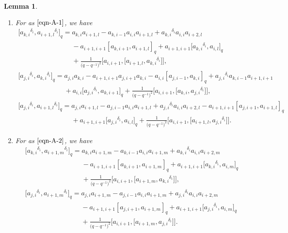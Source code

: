 \documentclass[10pt,a4paper]{amsart}
\numberwithin{equation}{section}
\def\lr#1{\left[#1\right]}
\def\d{\delta}
\def\A{\mathscr{A}}
\newtheorem{Lemma}[Theorem]{Lemma}
\begin{document}
\begin{Lemma}
\begin{enumerate}
\begin{gather}
\end{gather}
\item[$(2)$] For \smash{$\A_{j,k,i+1}^{k-1,i,l}$} as $\eqref{eqn-A-1}$, we have
\begin{gather}
\bigl[{a_{k,i}}^{\d_i},{a_{i+1,l}}^{\d_i}\bigr]_q
=a_{k,i}a_{i+1,l}-a_{k,i-1}a_{i,i}a_{i+1,l} +{a_{k,i}}^{\d_i}a_{i,i}a_{i+2,l}\nonumber \\
\phantom{\bigl[{a_{k,i}}^{\d_i},{a_{i+1,l}}^{\d_i}\bigr]_q
=}{}-a_{i+1,i+1}\lr{a_{k,i+1},a_{i+1,l}}_q
+a_{i+1,i+1}\bigl[{a_{k,i}}^{\d_i},a_{i,l}\bigr]_q\nonumber \\
\phantom{\bigl[{a_{k,i}}^{\d_i},{a_{i+1,l}}^{\d_i}\bigr]_q
=}{} +\frac{1}{\bigl(q-q^{-1}\bigr)^2}\bigl[a_{i,i+1},\bigl[a_{i+1,l},{a_{k,i}}^{\d_i}\bigr]\bigr], \label{ri-1} \\
\bigl[{a_{j,i}}^{\d_i},{a_{k,i}}^{\d_i}\bigr]_q=a_{j,i}a_{k,i} -a_{i+1,i+1}a_{j,i+1}a_{k,i}-a_{i,i}\lr{a_{j,i-1},a_{k,i}}_q +{a_{j,i}}^{\d_i}a_{k,i-1}a_{i+1,i+1}\nonumber \\
\phantom{\bigl[{a_{j,i}}^{\d_i},{a_{k,i}}^{\d_i}\bigr]_q=}{}
+a_{i,i}\bigl[{a_{j,i}}^{\d_i}, a_{k,i+1}]_q +\frac{1}{\bigl(q-q^{-1}\bigr)^2}\bigl[a_{i,i+1},\bigl[a_{k,i},{a_{j,i}}^{\d_i}\bigr]\bigr], \label{ri-2} \\
\bigl[{a_{j,i}}^{\d_i}, {a_{i+1,l}}^{\d_i}\bigr]_q = a_{j,i}a_{i+1,l} -a_{j,i-1}a_{i,i}a_{i+1,l}+{a_{j,i}}^{\d_i}a_{i,i}a_{i+2,l} -a_{i+1,i+1}[a_{j,i+1},a_{i+1,l}]_q\nonumber \\
\phantom{\bigl[{a_{j,i}}^{\d_i}, {a_{i+1,l}}^{\d_i}\bigr]_q = }{}
+a_{i+1,i+1}\bigl[{a_{j,i}}^{\d_i},a_{i,l}\bigr]_q +\frac{1}{\bigl(q-q^{-1}\bigr)^2}\bigl[a_{i,i+1},\bigl[a_{i+1,l},{a_{j,i}}^{\d_i}\bigr]\bigr]. \label{ri-3}
\end{gather}
\item[$(3)$] For \smash{$\A_{j,k,i+1}^{i,l,m}$} as $\eqref{eqn-A-2}$, we have
\begin{gather}%
\bigl[{a_{k,i}}^{\d_i},{a_{i+1,m}}^{\d_i} \bigr]_q=a_{k,i}a_{i+1,m} -a_{k,i-1}a_{i,i}a_{i+1,m}+{a_{k,i}}^{\d_i}a_{i,i}a_{i+2,m}\nonumber \\
\phantom{\bigl[{a_{k,i}}^{\d_i},{a_{i+1,m}}^{\d_i} \bigr]_q=}{}
 -a_{i+1,i+1}\lr{a_{k,i+1},a_{i+1,m}}_q
+a_{i+1,i+1}\bigl[{a_{k,i}}^{\d_i},a_{i,m}\bigr]_q
\nonumber \\
\phantom{\bigl[{a_{k,i}}^{\d_i},{a_{i+1,m}}^{\d_i} \bigr]_q=}{}
+\frac{1}{\bigl(q-q^{-1}\bigr)^2}\bigl[a_{i,i+1},\bigl[a_{i+1,m},{a_{k,i}}^{\d_i}\bigr]\bigr], \label{ri-4} \\
\bigl[{a_{j,i}}^{\d_i},{a_{i+1,m}}^{\d_i}\bigr]_q=a_{j,i}a_{i+1,m} -a_{j,i-1}a_{i,i}a_{i+1,m}+{a_{j,i}}^{\d_i}a_{i,i}a_{i+2,m}\nonumber \\
\phantom{\bigl[{a_{j,i}}^{\d_i},{a_{i+1,m}}^{\d_i}\bigr]_q=}{}
 -a_{i+1,i+1}\lr{a_{j,i+1},a_{i+1,m}}_q+a_{i+1,i+1}\bigl[{a_{j,i}}^{\d_i},a_{i,m}\bigr]_q
 \nonumber \\
\phantom{\bigl[{a_{j,i}}^{\d_i},{a_{i+1,m}}^{\d_i}\bigr]_q=}{}
+\frac{1}{\bigl(q-q^{-1}\bigr)^2}\bigl[a_{i,i+1},\bigl[a_{i+1,m},{a_{j,i}}^{\d_i}\bigr]\bigr].\nonumber
\end{gather}
\end{enumerate}
\end{Lemma}
\end{document}
